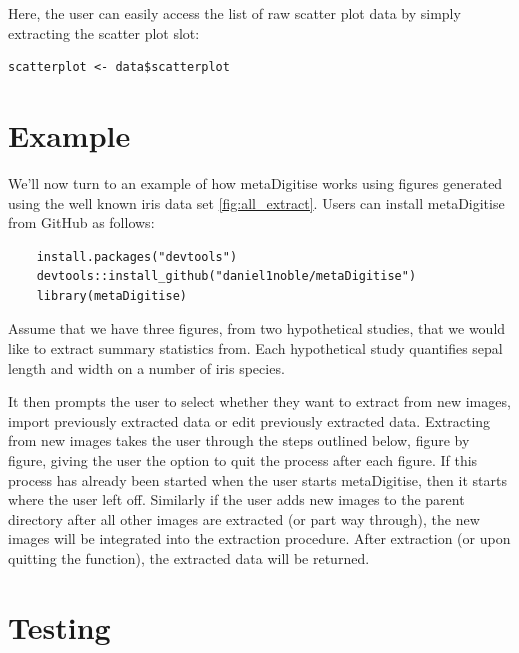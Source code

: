 \documentclass{article}
\begin{document}
Here, the user can easily access the list of raw scatter plot data by simply extracting the scatter plot slot:

\begin{verbatim}
scatterplot <- data$scatterplot
\end{verbatim}


\section{Example}
We'll now turn to an example of how metaDigitise works using figures generated using the well known iris data set \ref{fig:all_extract}. Users can install metaDigitise from GitHub as follows:

\begin{verbatim}
	install.packages("devtools")
	devtools::install_github("daniel1noble/metaDigitise")
	library(metaDigitise)
\end{verbatim}

Assume that we have three figures, from two hypothetical studies, that we would like to extract summary statistics from. Each hypothetical study quantifies sepal length and width on a number of iris species. 

It then prompts the user to select whether they want to extract from new images, import previously extracted data or edit previously extracted data. Extracting from new images takes the user through the steps outlined below, figure by figure, giving the user the option to quit the process after each figure. If this process has already been started when the user starts metaDigitise, then it starts where the user left off. Similarly if the user adds new images to the parent directory after all other images are extracted (or part way through), the new images will be integrated into the extraction procedure. After extraction (or upon quitting the function), the extracted data will be returned. %

\section{Testing}
\end{document}
